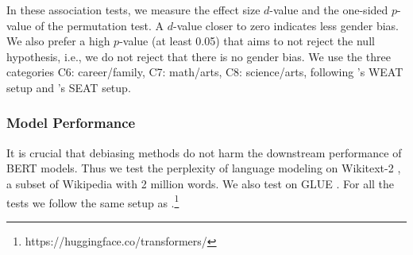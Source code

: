 %
In these association tests, we measure the effect size $d$-value and the
one-sided $p$-value of the permutation test.  A $d$-value closer to zero indicates less gender bias.  We also prefer a high $p$-value (at least 0.05) that aims to not reject the null hypothesis, i.e., we do not reject that there is no gender bias. We use the three categories C6: career/family, C7: math/arts, C8: science/arts, following 's WEAT setup and 's SEAT setup.

\subsubsection{Model Performance}
It is crucial that debiasing methods do not harm the downstream
performance of BERT models. Thus we test the perplexity of language modeling on Wikitext-2 \cite{merity2016pointer}, a subset of Wikipedia with 2 million words. We also test on GLUE  \cite{wang2018glue}. For all the tests we follow the same setup as \cite{wolf2019huggingfaces}.\footnote{https://huggingface.co/transformers/}
